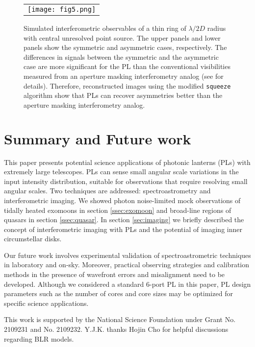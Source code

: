 \documentclass[]{AO4ELT}  %
\begin{document}
\begin{figure} [hbt!]
\begin{center}
\begin{tabular}{c} 
\texttt{[image: fig5.png]}
\end{tabular}
\end{center}
\caption[example] 
{ \label{fig:ring} 
Simulated interferometric observables of a thin ring of $\lambda/2D$ radius with central unresolved point source. The upper panels and lower panels show the symmetric and asymmetric cases, respectively. The differences in signals between the symmetric and the asymmetric case are more significant for the PL than the conventional visibilities measured from an aperture masking interferometry analog (see \cite{kim23} for details). Therefore, reconstructed images using the modified {\tt squeeze} algorithm \cite{bar10} show that PLs can recover asymmetries better than the aperture masking interferometry analog.}
\end{figure} 



\section{Summary and Future work}

This paper presents potential science applications of photonic lanterns (PLs) with extremely large telescopes. PLs can sense small angular scale variations in the input intensity distribution, suitable for observations that require resolving small angular scales. Two techniques are addressed: spectroastrometry and interferometric imaging. We showed photon noise-limited mock observations of tidally heated exomoons in section \ref{ssec:exomoon} and broad-line regions of quasars in section \ref{ssec:quasar}. In section \ref{sec:imaging} we briefly described the concept of interferometric imaging with PLs and the potential of imaging inner circumstellar disks. 

Our future work involves experimental validation of spectroastrometric techniques in laboratory and on-sky. Moreover, practical observing strategies and calibration methods in the presence of wavefront errors and misalignment need to be developed. Although we considered a standard 6-port PL in this paper, PL design parameters such as the number of cores and core sizes may be optimized \cite{lin23} for specific science applications.




\acknowledgments %
 
This work is supported by the National Science Foundation under Grant No. 2109231 and No. 2109232.
Y.J.K. thanks Hojin Cho for helpful discussions regarding BLR models.


\printbibliography %
\end{document}
